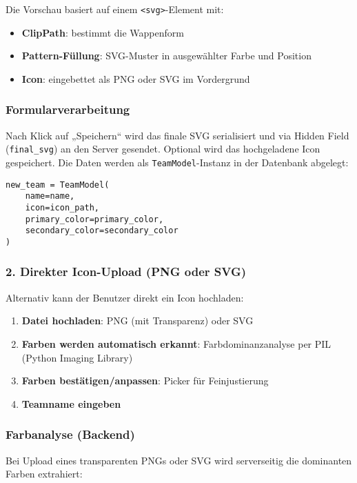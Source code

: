 \documentclass[12pt]{article}
\begin{document}
\noindent Die Vorschau basiert auf einem \texttt{<svg>}-Element mit:
\begin{itemize}
  \item \textbf{ClipPath}: bestimmt die Wappenform
  \item \textbf{Pattern-Füllung}: SVG-Muster in ausgewählter Farbe und Position
  \item \textbf{Icon}: eingebettet als PNG oder SVG im Vordergrund
\end{itemize}

\subsubsection*{Formularverarbeitung}

Nach Klick auf „Speichern“ wird das finale SVG serialisiert und via Hidden Field (\texttt{final\_svg}) an den Server gesendet. Optional wird das hochgeladene Icon gespeichert. Die Daten werden als \texttt{TeamModel}-Instanz in der Datenbank abgelegt:

\begin{verbatim}
new_team = TeamModel(
    name=name,
    icon=icon_path,
    primary_color=primary_color,
    secondary_color=secondary_color
)
\end{verbatim}

\subsubsection*{2. Direkter Icon-Upload (PNG oder SVG)}

Alternativ kann der Benutzer direkt ein Icon hochladen:

\begin{enumerate}
  \item \textbf{Datei hochladen}: PNG (mit Transparenz) oder SVG
  \item \textbf{Farben werden automatisch erkannt}: Farbdominanzanalyse per PIL (Python Imaging Library)
  \item \textbf{Farben bestätigen/anpassen}: Picker für Feinjustierung
  \item \textbf{Teamname eingeben}
\end{enumerate}

\subsubsection*{Farbanalyse (Backend)}

Bei Upload eines transparenten PNGs oder SVG wird serverseitig die dominanten Farben extrahiert:
\end{document}
